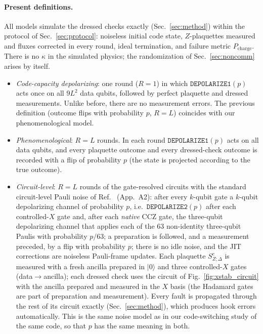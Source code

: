 \documentclass[a4paper]{article}
\providecommand{\ket}[1]{\ensuremath{|#1\rangle}}
\begin{document}
\paragraph{Present definitions.}
All models simulate the dressed checks exactly (Sec.~\ref{sec:method}) within the protocol of Sec.~\ref{sec:protocol}: noiseless initial code state, $Z$-plaquettes measured and fluxes corrected in every round, ideal termination, and failure metric $P_{\mathrm{charge}}$. There is no $\kappa$ in the simulated physics; the randomization of Sec.~\ref{sec:noncomm} arises by itself.
\begin{itemize}[leftmargin=*,itemsep=0pt]
\item \emph{Code-capacity depolarizing}: one round ($R=1$) in which $\mathtt{DEPOLARIZE1}(p)$ acts once on all $9L^2$ data qubits, followed by perfect plaquette and dressed measurements. Unlike before, there are no measurement errors. The previous definition (outcome flips with probability $p$, $R=L$) coincides with our phenomenological model.
\item \emph{Phenomenological}: $R=L$ rounds. In each round $\mathtt{DEPOLARIZE1}(p)$ acts on all data qubits, and every plaquette outcome and every dressed-check outcome is recorded with a flip of probability $p$ (the state is projected according to the true outcome).
\item \emph{Circuit-level}: $R=L$ rounds of the gate-resolved circuits with the standard circuit-level Pauli noise of Ref.~\cite{takada2026exact} (App.~A2): after every $k$-qubit gate a $k$-qubit depolarizing channel of probability $p$, i.e.\ $\mathtt{DEPOLARIZE2}(p)$ after each controlled-$X$ gate and, after each \emph{native} CCZ gate, the three-qubit depolarizing channel that applies each of the 63 non-identity three-qubit Paulis with probability $p/63$; a preparation is followed, and a measurement preceded, by a flip with probability $p$; there is no idle noise, and the JIT corrections are noiseless Pauli-frame updates. Each plaquette $S^c_{Z;\Delta}$ is measured with a fresh ancilla prepared in $\ket0$ and three controlled-$X$ gates (data$\to$ancilla); each dressed check uses the circuit of Fig.~\ref{fig:xstab_circuit} with the ancilla prepared and measured in the $X$ basis (the Hadamard gates are part of preparation and measurement). Every fault is propagated through the rest of its circuit exactly (Sec.~\ref{sec:method}), which produces hook errors automatically. This is the same noise model as in our code-switching study of the same code, so that $p$ has the same meaning in both.
\end{itemize}
\end{document}
